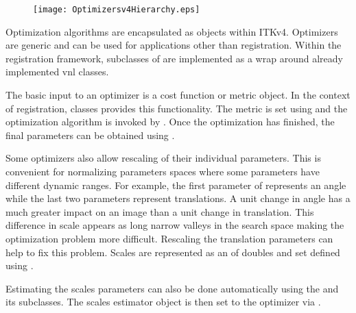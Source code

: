 


\begin{figure}
\center
\texttt{[image: Optimizersv4Hierarchy.eps]}
\label{fig:Optimizersv4Hierarchy}
\end{figure}

Optimization algorithms are encapsulated as 
objects within ITKv4. Optimizers are generic and can be used for applications
other than registration. Within the registration framework, subclasses of
 are implemented as a wrap
around already implemented vnl classes.


The basic input to an optimizer is a cost function or metric object. In the context
of registration,  classes provides this functionality.
The metric is set using  and
the optimization algorithm is invoked by .
Once the optimization has finished, the final parameters can be obtained
using .

Some optimizers also allow rescaling of their individual parameters. This is
convenient for normalizing parameters spaces where some parameters have
different dynamic ranges. For example, the first parameter of
 represents an angle while the last two parameters
represent translations. A unit change in angle has a much greater impact on an
image than a unit change in translation. This difference in scale appears as
long narrow valleys in the search space making the optimization problem more
difficult. Rescaling the translation parameters can help to fix this problem.
Scales are represented as an  of doubles and set defined using
.

Estimating the scales parameters can also be done automatically using the
 and its subclasses.
The scales estimator object is then set to the optimizer via
.


